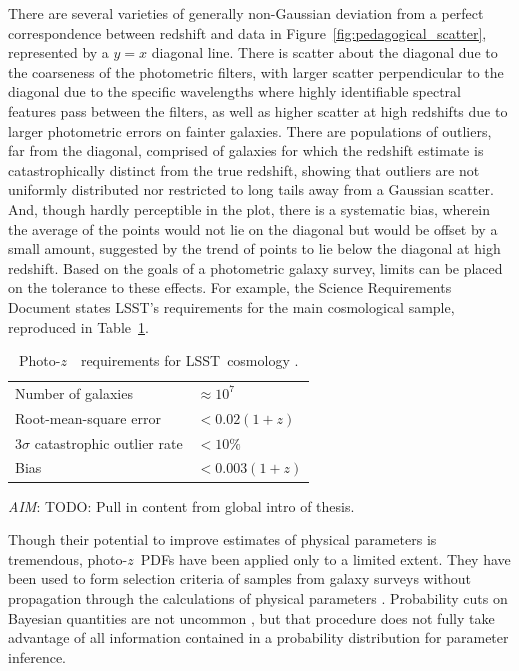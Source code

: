 \documentclass[iop]{emulateapj}
\newcommand{\todo}[3]{{\color{#2}\emph{#1}: #3}}
\newcommand{\aim}[1]{\todo{AIM}{red}{#1}}
\newcommand{\project}[1]{{\textsc{#1}}}
\newcommand{\lsst}{\project{LSST}}
\newcommand{\pz}{photo-$z$~}
\newcommand{\Pz}{Photo-$z$~}
\newcommand{\pzpdf}{\pz PDF}
\begin{document}
There are several varieties of generally non-Gaussian deviation from a perfect correspondence between redshift and data in Figure~\ref{fig:pedagogical_scatter}, represented by a $y = x$ diagonal line.
There is scatter about the diagonal due to the coarseness of the photometric filters, with larger scatter perpendicular to the diagonal due to the specific wavelengths where highly identifiable spectral features pass between the filters, as well as higher scatter at high redshifts due to larger photometric errors on fainter galaxies.
There are populations of outliers, far from the diagonal, comprised of galaxies for which the redshift estimate is catastrophically distinct from the true redshift, showing that outliers are not uniformly distributed nor restricted to long tails away from a Gaussian scatter.
And, though hardly perceptible in the plot, there is a systematic bias, wherein the average of the points would not lie on the diagonal but would be offset by a small amount, suggested by the trend of points to lie below the diagonal at high redshift.
Based on the goals of a photometric galaxy survey, limits can be placed on the tolerance to these effects.
For example, the Science Requirements Document \citep{mandelbaum_weak_2017} states \lsst's requirements for the main cosmological sample, reproduced in Table~\ref{tab:lsstsrd}.

\begin{table}
	\begin{center}
		\caption{\Pz\ requirements for \lsst\ cosmology \citep{mandelbaum_weak_2017}.}
		\begin{tabular}{ll}
			Number of galaxies & $\approx 10^{7}$\\
			Root-mean-square error & $< 0.02 (1 + z)$\\
			$3 \sigma$ catastrophic outlier rate & $< 10\%$\\
			Bias & $< 0.003 (1 + z)$\\
		\end{tabular}
	\label{tab:lsstsrd}
	\end{center}
\end{table}

\aim{TODO: Pull in content from global intro of thesis.}

Though their potential to improve estimates of physical parameters is tremendous, \pzpdf s have been applied only to a limited extent.  
They have been used to form selection criteria of samples from galaxy surveys without propagation 
through the calculations of physical parameters \citep{van_breukelen_reliable_2009, viironen_high_2015}.  
Probability cuts on Bayesian quantities are not uncommon \citep{leung_bayesian_2017, dipompeo_quasar_2015}, but that procedure does not fully take advantage of all information contained in a probability distribution for parameter inference.  
\end{document}
